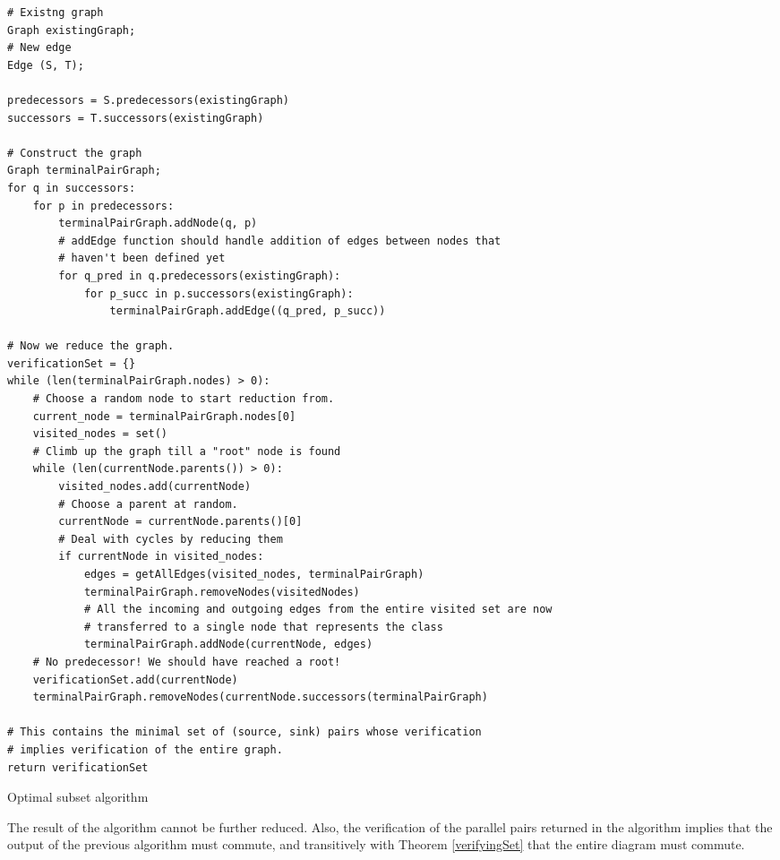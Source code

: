 \documentclass[sigplan,review,anonymous]{acmart}
\begin{document}
\begin{verbatim}
# Existng graph
Graph existingGraph;
# New edge
Edge (S, T);

predecessors = S.predecessors(existingGraph)
successors = T.successors(existingGraph)

# Construct the graph
Graph terminalPairGraph;
for q in successors:
    for p in predecessors:
        terminalPairGraph.addNode(q, p)
        # addEdge function should handle addition of edges between nodes that 
        # haven't been defined yet
        for q_pred in q.predecessors(existingGraph):
            for p_succ in p.successors(existingGraph):
                terminalPairGraph.addEdge((q_pred, p_succ))

# Now we reduce the graph.
verificationSet = {}
while (len(terminalPairGraph.nodes) > 0):
    # Choose a random node to start reduction from.
    current_node = terminalPairGraph.nodes[0]
    visited_nodes = set()
    # Climb up the graph till a "root" node is found
    while (len(currentNode.parents()) > 0):
        visited_nodes.add(currentNode)
        # Choose a parent at random.
        currentNode = currentNode.parents()[0]
        # Deal with cycles by reducing them
        if currentNode in visited_nodes:
            edges = getAllEdges(visited_nodes, terminalPairGraph)
            terminalPairGraph.removeNodes(visitedNodes)
            # All the incoming and outgoing edges from the entire visited set are now 
            # transferred to a single node that represents the class
            terminalPairGraph.addNode(currentNode, edges)
    # No predecessor! We should have reached a root!
    verificationSet.add(currentNode)
    terminalPairGraph.removeNodes(currentNode.successors(terminalPairGraph)

# This contains the minimal set of (source, sink) pairs whose verification 
# implies verification of the entire graph. 
return verificationSet

\end{verbatim}
\begin{algorithm}
    \caption{Optimal subset algorithm}
    \label{optimal}
\end{algorithm}


The result of the algorithm cannot be further reduced. Also, the verification of the parallel pairs returned in the algorithm implies that the output of the previous algorithm must commute, and transitively with Theorem \ref{verifyingSet} that the entire diagram must commute.
\end{document}
